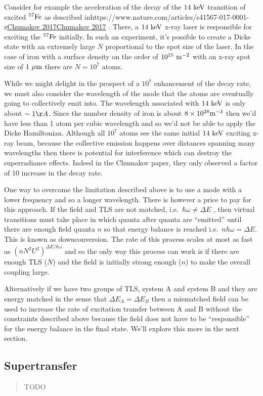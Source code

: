 \documentclass[
]{article}
\let\oldhref\href
\renewcommand{\href}[2]{\ifx#1\urlprefix\oldhref{#1}{#2}\else\uline{\oldhref{#1}{#2}}\fi}
\renewcommand{\[}{\begin{equation}}
\renewcommand{\]}{\end{equation}}
\begin{document}
Consider for example the acceleration of the decay of the
\(\rm 14\ keV\) transition of excited \(\rm ^{57}Fe\) as described
in\href{https://www.nature.com/articles/s41567-017-0001-z}{Chumakov
2017} . There, a \(\rm 14\ keV\) x-ray laser is responsible for exciting
the \(\rm ^{57}Fe\) initially. In such an experiment, it's possible to
create a Dicke state with an extremely large \(N\) proportional to the
spot size of the laser. In the case of iron with a surface density on
the order of \(10^{15} \ \rm m^{-2}\) with an x-ray spot size of
\(1 \ \rm \mu m\) there are \(N=10^7\) atoms.

While we might delight in the prospect of a \(10^{7}\) enhancement of
the decay rate, we must also consider the wavelength of the mode that
the atoms are eventually going to collectively emit into. The wavelength
associated with \(\rm 14\ keV\) is only about \(\sim 1\AA\). Since the
number density of iron is about \(8\times 10^{28} \rm m^{-3}\) then we'd
have less than 1 atom per cubic wavelength and so we'd not be able to
apply the Dicke Hamiltonian. Although all \(10^{7}\) atoms see the same
initial \(\rm 14\ keV\) exciting x-ray beam, because the collective
emission happens over distances spanning many wavelengths then there is
potential for interference which can destroy the superradiance effects.
Indeed in the Chumakov paper, they only observed a factor of 10 increase
in the decay rate.

One way to overcome the limitation described above is to use a mode with
a lower frequency and so a longer wavelength. There is however a price
to pay for this approach. If the field and TLS are not matched,
i.e.~\(\hbar\omega \neq \Delta E\) , then virtual transitions must take
place in which quanta after quanta are ``emitted'' until there are
enough field quanta \(n\) so that energy balance is reached
i.e.~\(n\hbar\omega = \Delta E\). This is known as downconversion. The
rate of this process scales at most as fast as
\((nN^2U^2)^{\Delta E / \hbar\omega}\) and so the only way this process
can work is if there are enough TLS (\(N\)) and the field is initially
strong enough (\(n\)) to make the overall coupling large.

Alternatively if we have two groups of TLS, system A and system B and
they are energy matched in the sense that \(\Delta E_A = \Delta E_B\)
then a mismatched field can be used to increase the rate of excitation
transfer between A and B without the constraints described above because
the field does not have to be ``responsible'' for the energy balance in
the final state. We'll explore this more in the next section.

\subsection{Supertransfer}\label{supertransfer}

\begin{quote}
TODO
\end{quote}

\printbibliography
\end{document}
